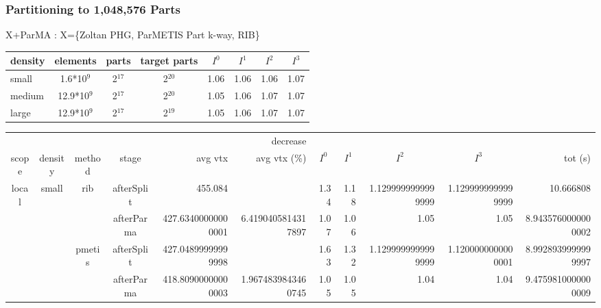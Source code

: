 \documentclass{beamer}
\begin{document}
\begin{frame}
  \frametitle{Partitioning to 1,048,576 Parts}
  \small
  X+ParMA : X=\{Zoltan PHG, ParMETIS Part k-way, RIB\}
  \tiny
  \begin{tabular}{ l|ccccccc }
    density & elements    & parts    & target parts & $I^0$ & $I^1$ & $I^2$ & $I^3$  \\
    \hline
    small   & 1.6*10$^9$  & 2$^{17}$ & 2$^{20}$     & 1.06  & 1.06  & 1.06  & 1.07  \\
    medium  & 12.9*10$^9$ & 2$^{17}$ & 2$^{20}$     & 1.05  & 1.06  & 1.07  & 1.07  \\
    large   & 12.9*10$^9$ & 2$^{17}$ & 2$^{19}$     & 1.05  & 1.06  & 1.07  & 1.07  \\
  \end{tabular}
  \npstyleenglish
  \begin{tabular}{ c c c c N{4}{2} N{4}{2} N{1}{2} N{1}{2} N{1}{2} N{1}{2} N{3}{2} }
    \tiny
           &         &        &            &                    & {decrease}          &                             &                             &                             &                             & \\
    scope  & density & method & stage      & {avg vtx}          & {avg vtx (\%)}      &  &  &  &  & {tot (s)}\\
    \hline
    local  & small   & rib    & afterSplit & 455.084            &                     & 1.34                        & 1.18                        & 1.1299999999999999          & 1.1299999999999999          & 10.666808\\
           &         &        & afterParma & 427.63400000000001 & 6.4190405814317897  & 1.07                        & 1.06                        & 1.05                        & 1.05                        & 8.9435760000000002\\
           &         & pmetis & afterSplit & 427.04899999999998 &                     & 1.63                        & 1.32                        & 1.1299999999999999          & 1.1200000000000001          & 8.9928939999999997\\
           &         &        & afterParma & 418.80900000000003 & 1.9674839843460745  & 1.05                        & 1.05                        & 1.04                        & 1.04                        & 9.4759810000000009\\

\end{tabular}
\end{frame}
\end{document}
